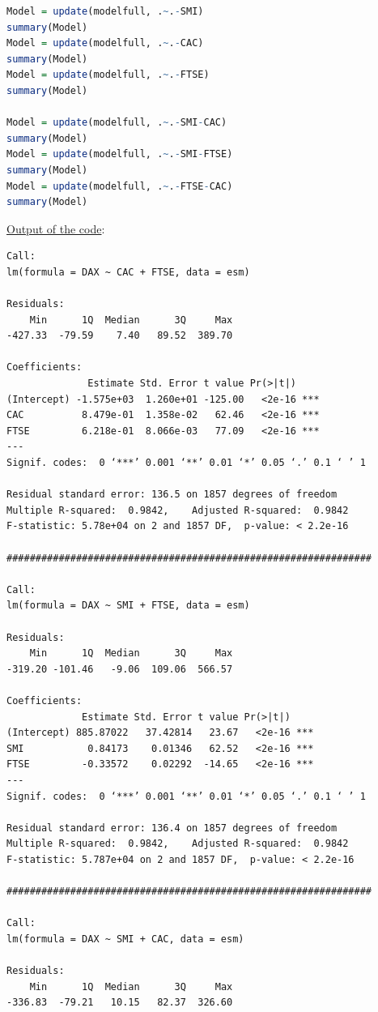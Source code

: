 \documentclass[a4paper, 11pt]{article}
\begin{document}
\begin{lstlisting}[language=R]
Model = update(modelfull, .~.-SMI)
summary(Model)
Model = update(modelfull, .~.-CAC)
summary(Model)
Model = update(modelfull, .~.-FTSE)
summary(Model)

Model = update(modelfull, .~.-SMI-CAC)
summary(Model)
Model = update(modelfull, .~.-SMI-FTSE)
summary(Model)
Model = update(modelfull, .~.-FTSE-CAC)
summary(Model)
\end{lstlisting}
\vspace{1em}
\underline{Output of the code}:
\begingroup \fontsize{2pt}{4pt}\selectfont
\begin{verbatim}
Call:
lm(formula = DAX ~ CAC + FTSE, data = esm)

Residuals:
    Min      1Q  Median      3Q     Max 
-427.33  -79.59    7.40   89.52  389.70 

Coefficients:
              Estimate Std. Error t value Pr(>|t|)    
(Intercept) -1.575e+03  1.260e+01 -125.00   <2e-16 ***
CAC          8.479e-01  1.358e-02   62.46   <2e-16 ***
FTSE         6.218e-01  8.066e-03   77.09   <2e-16 ***
---
Signif. codes:  0 ‘***’ 0.001 ‘**’ 0.01 ‘*’ 0.05 ‘.’ 0.1 ‘ ’ 1

Residual standard error: 136.5 on 1857 degrees of freedom
Multiple R-squared:  0.9842,	Adjusted R-squared:  0.9842 
F-statistic: 5.78e+04 on 2 and 1857 DF,  p-value: < 2.2e-16

###############################################################

Call:
lm(formula = DAX ~ SMI + FTSE, data = esm)

Residuals:
    Min      1Q  Median      3Q     Max 
-319.20 -101.46   -9.06  109.06  566.57 

Coefficients:
             Estimate Std. Error t value Pr(>|t|)    
(Intercept) 885.87022   37.42814   23.67   <2e-16 ***
SMI           0.84173    0.01346   62.52   <2e-16 ***
FTSE         -0.33572    0.02292  -14.65   <2e-16 ***
---
Signif. codes:  0 ‘***’ 0.001 ‘**’ 0.01 ‘*’ 0.05 ‘.’ 0.1 ‘ ’ 1

Residual standard error: 136.4 on 1857 degrees of freedom
Multiple R-squared:  0.9842,	Adjusted R-squared:  0.9842 
F-statistic: 5.787e+04 on 2 and 1857 DF,  p-value: < 2.2e-16

###############################################################

Call:
lm(formula = DAX ~ SMI + CAC, data = esm)

Residuals:
    Min      1Q  Median      3Q     Max 
-336.83  -79.21   10.15   82.37  326.60 


\end{verbatim}
\end{document}
